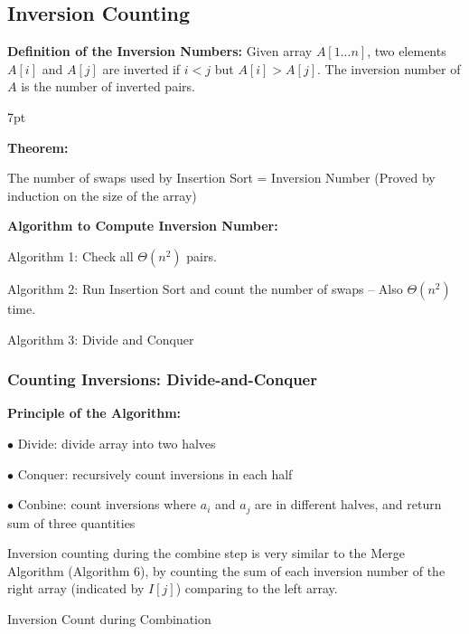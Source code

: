 \documentclass[10pt]{article}
\newenvironment{formal}[2]{%
	\def\FrameCommand{%
		\hspace{1pt}%
		{\color{#1}\vrule width 2pt}%
		{\color{#2}\vrule width 4pt}%
		\colorbox{#2}%
	}%
	\MakeFramed{\advance\hsize-\width\FrameRestore}%
	\noindent\hspace{-4.55pt}%
	\begin{adjustwidth}{}{7pt}%
		\vspace{2pt}\vspace{2pt}%
	}
	{%
		\vspace{2pt}\end{adjustwidth}\endMakeFramed%
}
\begin{document}
\newpage

\subsection{Inversion Counting}

\textbf{Definition of the Inversion Numbers:} Given array $A[1 ... n]$, two elements $A[i]$ and $A[j]$ are inverted if $i < j$ but $A[i] > A[j]$. The inversion number of $A$ is the number of inverted pairs.

\begin{formal}{DarkBlue}{blueshade}
	
	\textbf{Theorem:}

	The number of swaps used by Insertion Sort = Inversion Number (Proved by induction on the size of the array)
	
	\noindent \textbf{Algorithm to Compute Inversion Number:}
	
	Algorithm 1: Check all $\Theta(n^2)$ pairs.
	
	Algorithm 2: Run Insertion Sort and count the number of swaps – Also $\Theta(n^2)$ time.
	
	Algorithm 3: Divide and Conquer
	
\end{formal}

\subsubsection{Counting Inversions: Divide-and-Conquer}

\textbf{Principle of the Algorithm:}

$\bullet$ Divide: divide array into two halves

$\bullet$ Conquer: recursively count inversions in each half

$\bullet$ Conbine: count inversions where $a_i$ and $a_j$ are in different halves, and return sum of three quantities

Inversion counting during the combine step is very similar to the Merge Algorithm (Algorithm 6), by counting the sum of each inversion number of the right array (indicated by $I[j]$) comparing to the left array.

\begin{algorithm}
	\SetAlgoLined
	\caption{Inversion Count during Combination}
\end{algorithm}
\end{document}
